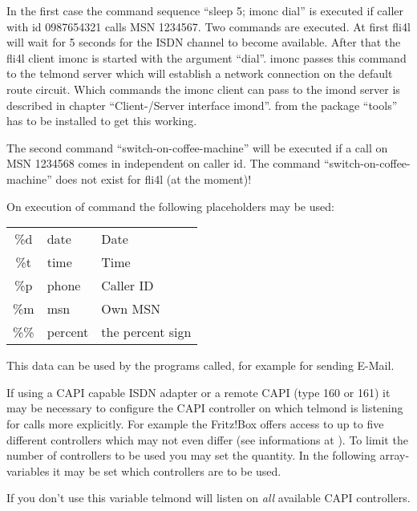 \begin{description}
  In the first case the command sequence ``sleep 5; imonc dial'' is executed 
  if caller with id 0987654321 calls MSN 1234567. Two commands are executed.
  At first fli4l will wait for 5 seconds for the ISDN channel to become available. 
  After that the fli4l client imonc is started with the argument ``dial''. 
  imonc passes this command to the telmond server which will establish a 
  network connection on the default route circuit. Which commands the imonc 
  client can pass to the imond server is described in chapter ``Client-/Server 
  interface imond''.  from the package ``tools'' has to be 
  installed to get this working.
  
  The second command ``switch-on-coffee-machine'' will be executed if a call 
  on MSN 1234568 comes in independent on caller id. The command 
  ``switch-on-coffee-machine'' does not exist for fli4l (at the moment)!
  
  On execution of command the following placeholders may be used:

  \begin{tabular}[h!]{cll}
  \hline
            \%d  &    date   &     Date \\
            \%t  &    time   &     Time \\
            \%p  &    phone  &     Caller ID \\
            \%m  &    msn     &    Own MSN \\
            \%\%  &    percent &    the percent sign\\
  \end{tabular}
  
  This data can be used by the programs called, for example for sending \mbox{E-Mail}.


  If using a CAPI capable ISDN adapter or a remote CAPI (type 160 or 161) 
  it may be necessary to configure the CAPI controller on which telmond is 
  listening for calls more explicitly. For example the Fritz!Box offers access 
  to up to five different controllers which may not even differ (see informations 
  at ).
  To limit the number of controllers to be used you may set the quantity. 
  In the following array-variables  it may be set 
  which controllers are to be used.

  If you don't use this variable telmond will listen on \emph{all} available CAPI 
  controllers.


\end{description}

